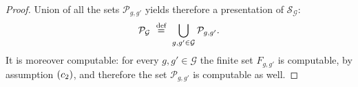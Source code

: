 \documentclass[10pt,a4paper]{amsart}
\newcommand{\CA}[1]{$(\textsc{c}_{#1})$}
\newcommand{\E}{{\embed{\WW}}}
\newcommand{\G}{\mathcal{G}}
\newcommand{\M}{\mathcal{M}}
\newcommand{\Pres}[1]{\mathcal{P}_{#1}}
\newcommand{\Sof}[1]{\mathcal{S}(#1)}
\newcommand{\Ssub}[1]{\mathcal{S}_{#1}}
\newcommand{\V}{Y}
\newcommand{\W}{A}
\newcommand{\WW}{\mathcal{A}}
\newcommand{\defeq}{\stackrel{\text{\tiny def}}{=}}
\newcommand{\embed}[1]{\text{\sc Emb}_{#1}}
\newcommand{\renorder}{\leadsto}
\newcommand{\restr}[2]{{#1}{|#2}}
\newcommand{\setof}[2]{\left\{#1 \, \middle\vert \, #2\right\}}
\newcommand{\subseteqfin}{\subseteq_\text{fin}}
\begin{document}
\begin{proof}
Union of all the sets $\Pres{g,g'}$ yields therefore a presentation of $\Ssub \G$:
\[
\Pres{\G} \ \defeq \ \bigcup_{g,g'\in\G}\Pres{g,g'}.
\]
It is moreover computable:
for every $g,g'\in\G$ the finite set $F_{g,g'}$ is computable, by assumption \CA 2,
and therefore the set $\Pres{g,g'}$ is computable as well.
%
%

\end{proof}
\end{document}

